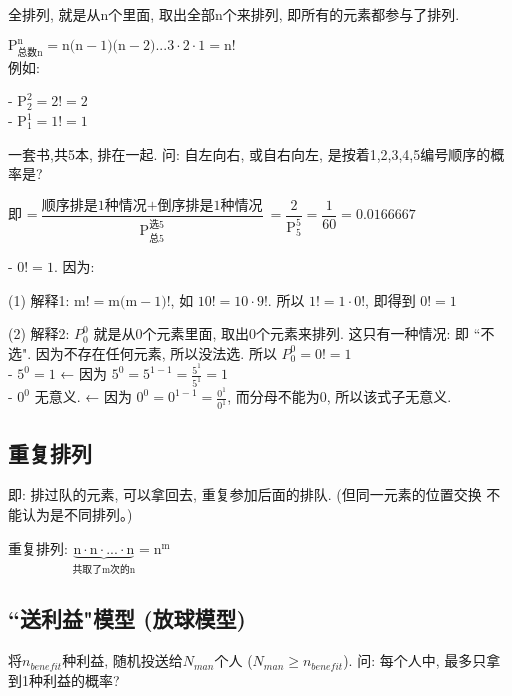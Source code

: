 \documentclass[UTF8]{ctexart}
\begin{document}
	全排列, 就是从n个里面, 取出全部n个来排列, 即所有的元素都参与了排列.
	
	$ \boxed{
	\text{P}_{\text{总数n}}^{\text{n}}=\text{n(n}-1\text{)(n}-2\text{)}...3\cdot 2\cdot 1=\text{n!}
	}
	$ \\
	
	例如:
	
	- $	\text{P}_{2}^{2}=2!=2	$ \\	
	- $ \text{P}_{1}^{1}=1!=1$ \\
	
		\begin{myEnvSample}
		一套书,共5本, 排在一起. 问: 自左向右, 或自右向左, 是按着1,2,3,4,5编号顺序的概率是?
		
		即 =$
		\dfrac{\text{顺序排是1种情况}+\text{倒序排是1种情况}}{\text{P}_{\text{总}5}^{\text{选}5}}=\dfrac{2}{\text{P}_{5}^{5}}=\dfrac{1}{60}=0.0166667
		$
	\end{myEnvSample} 


	
	- $0!=1$.  因为: 
	
	(1) 解释1: $\text{m!}=\text{m(m}-1\text{)!}$, 如 $10! =10 \cdot 9!$. 所以 $1! = 1 \cdot 0!$, 即得到 $0!=1$
	
	(2) 解释2: $P_{0}^{0}$ 就是从0个元素里面, 取出0个元素来排列. 这只有一种情况: 即 ``不选". 因为不存在任何元素, 所以没法选. 所以 $P_0^0=0!=1$ \\
	
	- $5^0 =1$ ← 因为 $5^0=5^{1-1}=\frac{5^1}{5^1}=1$ \\	
	- $0^0$ 无意义. ← 因为 $0^0=0^{1-1}=\frac{0^1}{0^1}$, 而分母不能为0, 所以该式子无意义.
	
	
	
	\subsection{重复排列}
	
	即: 排过队的元素, 可以拿回去, 重复参加后面的排队.  (但同一元素的位置交换 不能认为是不同排列。)
	
	重复排列: $\underset{\text{共取了m次的n}}{\underbrace{\text{n}\cdot \text{n}\cdot ...\cdot \text{n}}}=\text{n}^{\text{m}}	$ \\
	
		
	\subsection{``送利益"模型 (放球模型)}
	
	将$n_{benefit}$种利益, 随机投送给$N_{man}$个人 ($N_{man}\ge n_{benefit}$). 问: 每个人中, 最多只拿到1种利益的概率?
	
\end{document}
